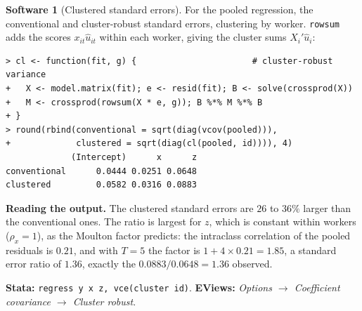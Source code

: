 \documentclass[11pt,a4paper]{article}
\numberwithin{equation}{section}
\theoremstyle{definition}
\newtheorem{software}[thm]{Software}
\begin{document}
\begin{software}[Clustered standard errors]
\label{sw:cluster}
For the pooled regression, the conventional and cluster-robust standard errors, clustering by worker. \texttt{rowsum} adds the scores $x_{it}\hat u_{it}$ within each
worker, giving the cluster sums $X_i'\hat u_i$:
{\small\begin{verbatim}
> cl <- function(fit, g) {                       # cluster-robust variance
+   X <- model.matrix(fit); e <- resid(fit); B <- solve(crossprod(X))
+   M <- crossprod(rowsum(X * e, g)); B %*% M %*% B
+ }
> round(rbind(conventional = sqrt(diag(vcov(pooled))),
+             clustered = sqrt(diag(cl(pooled, id)))), 4)
             (Intercept)      x      z
conventional      0.0444 0.0251 0.0648
clustered         0.0582 0.0316 0.0883
\end{verbatim}}
\textbf{Reading the output.} The clustered standard errors are $26$ to $36\%$ larger than the conventional ones. The ratio is largest for $z$, which is constant within
workers ($\rho_x = 1$), as the Moulton factor predicts: the intraclass correlation of the pooled residuals is $0.21$, and with $T = 5$ the factor is
$1 + 4 \times 0.21 = 1.85$, a standard error ratio of $1.36$, exactly the $0.0883/0.0648 = 1.36$ observed.

\textbf{Stata:} \texttt{regress y x z, vce(cluster id)}. \textbf{EViews:} \emph{Options $\to$ Coefficient covariance $\to$ Cluster robust}.
\end{software}
\end{document}
